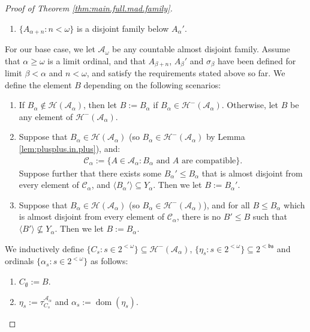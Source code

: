 \documentclass[10pt,a4paper]{amsart}
\theoremstyle{plain}
\numberwithin{equation}{section}
\theoremstyle{definition}
\newcommand{\func}{\operatorname}
\renewcommand{\c}[1]{\langle #1 \rangle}
\newcommand{\cal}{\mathcal}
\renewcommand{\frak}{\mathfrak}
\newcommand{\dom}{\func{dom}}
\newcommand{\A}{\cal{A}}
\renewcommand{\H}{\cal{H}}
\begin{document}
\begin{proof}[Proof of Theorem \ref{thm:main.full.mad.family}]
\begin{enumerate}
        \item $\{A_{\alpha+n} : n < \omega\}$ is a disjoint family below $A_\alpha'$.
    \end{enumerate}
    For our base case, we let $\A_\omega$ be any countable almost disjoint family. Assume that $\alpha \geq \omega$ is a limit ordinal, and that $A_{\beta+n}$, $A_\beta'$ and $\sigma_\beta$ have been defined for limit $\beta < \alpha$ and $n < \omega$, and satisfy the requirements stated above so far. We define the element $B$ depending on the following scenarios:
    \begin{enumerate}[label=(\alph*)]
        \item If $B_\alpha \notin \H(\A_\alpha)$, then let $B := B_\alpha$ if $B_\alpha \in \H^-(\A_\alpha)$. Otherwise, let $B$ be any element of $\H^-(\A_\alpha)$.

        \item Suppose that $B_\alpha \in \H(\A_\alpha)$ (so $B_\alpha \in \H^-(\A_\alpha)$ by Lemma \ref{lem:plusplus.in.plus}), and:
        \begin{align*}
            \cal{C}_\alpha := \{A \in \A_\alpha : B_\alpha \text{ and } A \text{ are compatible}\}.
        \end{align*}
        Suppose further that there exists some $B_\alpha' \leq B_\alpha$ that is almost disjoint from every element of $\cal{C}_\alpha$, and $\c{B_\alpha'} \subseteq Y_\alpha$. Then we let $B := B_\alpha'$.

        \item Suppose that $B_\alpha \in \H(\A_\alpha)$ (so $B_\alpha \in \H^-(\A_\alpha)$), and for all $B \leq B_\alpha$ which is almost disjoint from every element of $\cal{C}_\alpha$, there is no $B' \leq B$ such that $\c{B'} \not\subseteq Y_\alpha$. Then we let $B := B_\alpha$.
    \end{enumerate}
    We inductively define $\{C_s : s \in 2^{<\omega}\} \subseteq \H^-(\A_\alpha)$, $\{\eta_s : s \in 2^{<\omega}\} \subseteq 2^{<\frak{bs}}$ and ordinals $\{\alpha_s : s \in 2^{<\omega}\}$ as follows:
    \begin{enumerate}
        \item $C_\emptyset := B$.

        \item $\eta_s := \tau_{C_s}^{\A_\alpha}$ and $\alpha_s := \dom(\eta_s)$.


\end{enumerate}
\end{proof}
\end{document}
